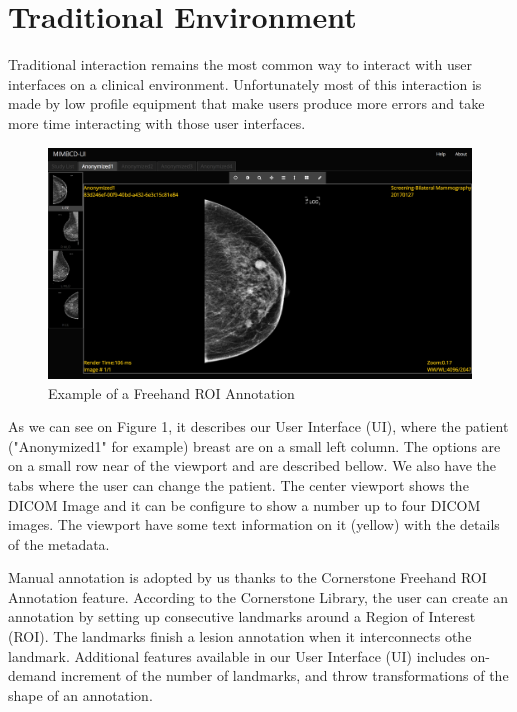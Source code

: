 \documentclass{article}
\begin{document}
\section{Traditional Environment}

Traditional interaction remains the most common way to interact with user interfaces on a clinical environment. Unfortunately most of this interaction is made by low profile equipment that make users produce more errors and take more time interacting with those user interfaces.

\begin{figure}[h]
\caption{Example of a Freehand ROI Annotation}
\centering
\includegraphics[width=\textwidth]{img1.png}
\end{figure}

As we can see on Figure 1, it describes our User Interface (UI), where the patient ("Anonymized1" for example) breast are on a small left column. The options are on a small row near of the viewport and are described bellow. We also have the tabs where the user can change the patient. The center viewport shows the DICOM Image and it can be configure to show a number up to four DICOM images. The viewport have some text information on it (yellow) with the details of the metadata.

Manual annotation is adopted by us thanks to the Cornerstone Freehand ROI Annotation feature. According to the Cornerstone Library, the user can create an annotation by setting up consecutive landmarks around a Region of Interest (ROI). The landmarks finish a lesion annotation when it interconnects othe landmark. Additional features available in our User Interface (UI) includes on-demand increment of the number of landmarks, and throw transformations of the shape of an annotation.

\clearpage
\end{document}
